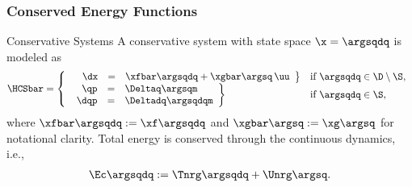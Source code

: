 \begin{frame}[t]
  \frametitle{Conserved Energy Functions}
   {
    \begin{block}{Conservative Systems}
      A conservative system with state space $\x = \argsqdq$ is modeled as
      \begin{align*}
        \HCSbar = \left\{
          \begin{array}{l l}
            \left.\begin{array}{r c l}
                \hspace{.58em}\dx &=& \xfbar\argsqdq + \xgbar\argsq \, \uu
              \end{array}\right\}  & \mbox{if } \argsqdq \in \D \setminus \S,\\
            \left. \begin{array}{r c l}
                \qp &=& \Deltaq\argsqm\\
                \dqp &=& \Deltadq\argsqdqm
              \end{array} \right\} & \mbox{if } \argsqdq \in \S,
          \end{array}\right.
      \end{align*}
      where $\xfbar\argsqdq := \xf\argsqdq$ and $\xgbar\argsq := \xg\argsq$ for
      notational clarity. Total energy is conserved through the continuous
      dynamics, i.e.,
      \begin{align*}
        \Ec\argsqdq := \Tnrg\argsqdq + \Unrg\argsq.
      \end{align*}
    \end{block}
  }


\end{frame}
